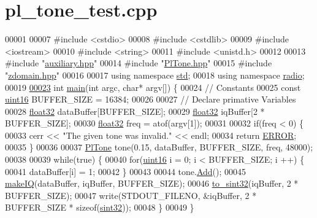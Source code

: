 \hypertarget{pl__tone__test_8cpp_source}{\section{pl\+\_\+tone\+\_\+test.\+cpp}
\label{pl__tone__test_8cpp_source}
}

\begin{DoxyCode}
00001 
00007 \textcolor{preprocessor}{#include <cstdio>}
00008 \textcolor{preprocessor}{#include <cstdlib>}
00009 \textcolor{preprocessor}{#include <iostream>}
00010 \textcolor{preprocessor}{#include <string>}
00011 \textcolor{preprocessor}{#include <unistd.h>}
00012 
00013 \textcolor{preprocessor}{#include "\hyperlink{auxiliary_8hpp}{auxiliary.hpp}"}
00014 \textcolor{preprocessor}{#include "\hyperlink{PlTone_8hpp}{PlTone.hpp}"}
00015 \textcolor{preprocessor}{#include "\hyperlink{zdomain_8hpp}{zdomain.hpp}"}
00016 
00017 \textcolor{keyword}{using namespace }\hyperlink{namespacestd}{std};
00018 \textcolor{keyword}{using namespace }\hyperlink{namespaceradio}{radio};
00019 
\hypertarget{pl__tone__test_8cpp_source_l00023}{}\hyperlink{pl__tone__test_8cpp_a0ddf1224851353fc92bfbff6f499fa97}{00023} \textcolor{keywordtype}{int} \hyperlink{pl__tone__test_8cpp_a0ddf1224851353fc92bfbff6f499fa97}{main}(\textcolor{keywordtype}{int} argc, \textcolor{keywordtype}{char}* argv[]) \{
00024     \textcolor{comment}{// Constants}
00025     \textcolor{keyword}{const} \hyperlink{definitions_8hpp_a05f6b0ae8f6a6e135b0e290c25fe0e4e}{uint16} BUFFER\_SIZE = 16384;
00026 
00027     \textcolor{comment}{// Declare primative Variables}
00028     \hyperlink{definitions_8hpp_aacdc525d6f7bddb3ae95d5c311bd06a1}{float32} dataBuffer[BUFFER\_SIZE];
00029     \hyperlink{definitions_8hpp_aacdc525d6f7bddb3ae95d5c311bd06a1}{float32} iqBuffer[2 * BUFFER\_SIZE];
00030     \hyperlink{definitions_8hpp_aacdc525d6f7bddb3ae95d5c311bd06a1}{float32} freq = atof(argv[1]);
00031 
00032     \textcolor{keywordflow}{if}(freq < 0) \{
00033         cerr << \textcolor{stringliteral}{"The given tone was invalid."} << endl;
00034         \textcolor{keywordflow}{return} \hyperlink{definitions_8hpp_a8fe83ac76edc595f6b98cd4a4127aed5}{ERROR};
00035     \}
00036 
00037     \hyperlink{classradio_1_1PlTone}{PlTone} tone(0.15, dataBuffer, BUFFER\_SIZE, freq, 48000);
00038 
00039     \textcolor{keywordflow}{while}(\textcolor{keyword}{true}) \{
00040         \textcolor{keywordflow}{for}(\hyperlink{definitions_8hpp_a05f6b0ae8f6a6e135b0e290c25fe0e4e}{uint16} i = 0; i < BUFFER\_SIZE; i ++) \{
00041             dataBuffer[i] = 1;
00042         \}
00043         
00044         tone.\hyperlink{classradio_1_1PlTone_a9e19b2d5106b35626d4839f04f9b9f95}{Add}();
00045         \hyperlink{namespaceradio_a7166522e76ff88e8d482491b1b6e2275}{makeIQ}(dataBuffer, iqBuffer, BUFFER\_SIZE);
00046         \hyperlink{namespaceradio_ae4b2334c4366dcdf0311ad79d2067945}{to\_sint32}(iqBuffer, 2 * BUFFER\_SIZE);
00047         write(STDOUT\_FILENO, &iqBuffer, 2 * BUFFER\_SIZE * \textcolor{keyword}{sizeof}(\hyperlink{definitions_8hpp_a0573de65958b4fda3a0460ed417dafb8}{sint32}));
00048     \}
00049 \}
\end{DoxyCode}
